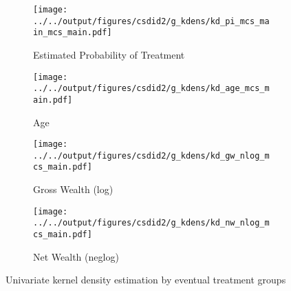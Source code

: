 \begin{figure}[htb!]
    \begin{subfigure}{0.425\textwidth}
        \caption{Estimated Probability of Treatment}
        \texttt{[image: ../../output/figures/csdid2/g\_kdens/kd\_pi\_mcs\_main\_mcs\_main.pdf]}
        \label{sfig:kd_pi_mcs_main_mcs_main}
    \end{subfigure}
    \begin{subfigure}{0.425\textwidth}
        \caption{Age}
        \texttt{[image: ../../output/figures/csdid2/g\_kdens/kd\_age\_mcs\_main.pdf]}
        \label{sfig:kd_age_mcs_main}
    \end{subfigure}
    \begin{subfigure}{0.425\textwidth}
        \caption{Gross Wealth (log)}
        \texttt{[image: ../../output/figures/csdid2/g\_kdens/kd\_gw\_nlog\_mcs\_main.pdf]}
        \label{sfig:kd_gw_nlog_mcs_main}
    \end{subfigure}
    \begin{subfigure}{0.425\textwidth}
        \caption{Net Wealth (neglog)}
        \texttt{[image: ../../output/figures/csdid2/g\_kdens/kd\_nw\_nlog\_mcs\_main.pdf]}
        \label{sfig:kd_nw_nlog_mcs_main}
    \end{subfigure}
    \caption{Univariate kernel density estimation by eventual treatment groups}\label{fig:kd_pcs_main}%
    \label{fig:univkerndens}
\end{figure}




